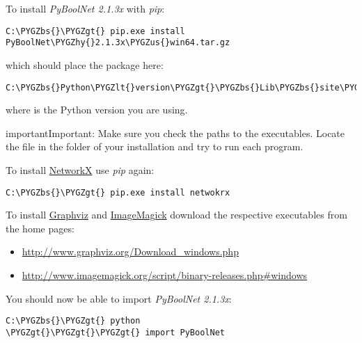 \documentclass[letterpaper,10pt,english]{sphinxmanual}
\def\PYGZbs{\char`\\}
\def\PYGZus{\char`\_}
\def\PYGZlt{\char`\<}
\def\PYGZgt{\char`\>}
\def\PYGZhy{\char`\-}
\begin{document}
To install \emph{PyBoolNet 2.1.3x} with \emph{pip}:

\begin{Verbatim}[commandchars=\\\{\}]
C:\PYGZbs{}\PYGZgt{} pip.exe install PyBoolNet\PYGZhy{}2.1.3x\PYGZus{}win64.tar.gz
\end{Verbatim}

which should place the package here:

\begin{Verbatim}[commandchars=\\\{\}]
C:\PYGZbs{}Python\PYGZlt{}version\PYGZgt{}\PYGZbs{}Lib\PYGZbs{}site\PYGZhy{}packages
\end{Verbatim}

where  is the Python version you are using.

\begin{notice}{important}{Important:}
Make sure you check the paths to the executables. Locate the file  in the  folder of your installation and
try to run each program.
\end{notice}

To install \href{https://networkx.github.io/}{NetworkX} use \emph{pip} again:

\begin{Verbatim}[commandchars=\\\{\}]
C:\PYGZbs{}\PYGZgt{} pip.exe install netwokrx
\end{Verbatim}

To install \href{http://www.graphviz.org/}{Graphviz} and \href{http://www.imagemagick.org/script/index.php}{ImageMagick} download the respective executables from the home pages:
\begin{itemize}
\item {} 
\href{http://www.graphviz.org/Download\_windows.php}{http://www.graphviz.org/Download\_windows.php}

\item {} 
\href{http://www.imagemagick.org/script/binary-releases.php\#windows}{http://www.imagemagick.org/script/binary-releases.php\#windows}

\end{itemize}

You should now be able to import \emph{PyBoolNet 2.1.3x}:

\begin{Verbatim}[commandchars=\\\{\}]
C:\PYGZbs{}\PYGZgt{} python
\PYGZgt{}\PYGZgt{}\PYGZgt{} import PyBoolNet
\end{Verbatim}
\end{document}

